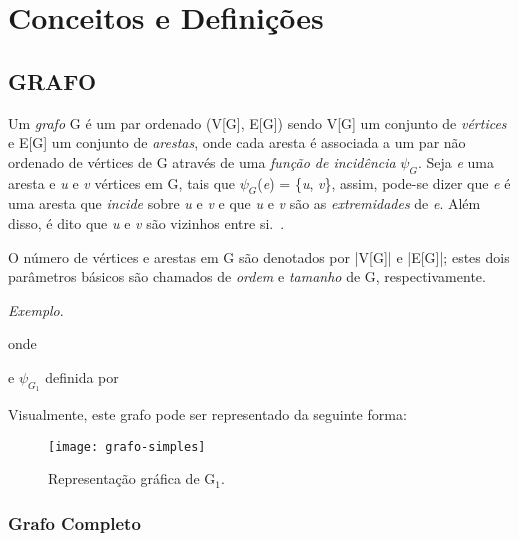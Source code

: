 \chapter{Conceitos e Definições}
\label{conceitos}

\section{\texorpdfstring{\MakeUppercase{Grafo}}{}}
\label{conceitos__grafo}

Um \emph{grafo} G é um par ordenado (V[G], E[G]) sendo V[G] um conjunto de \emph{vértices} e E[G] um conjunto de \emph{arestas}, onde cada aresta é associada a um par não ordenado de vértices de G através de uma \emph{função de incidência} $\psi_{G}$. Seja \emph{e} uma aresta e \emph{u} e \emph{v} vértices em G, tais que $\psi_{G}$(\emph{e}) = \{\emph{u}, \emph{v}\}, assim, pode-se dizer que \emph{e} é uma aresta que \emph{incide} sobre \emph{u} e \emph{v} e que \emph{u} e \emph{v} são as \emph{extremidades} de \emph{e}. Além disso, é dito que \emph{u} e \emph{v} são vizinhos entre si.~\cite{bondy1976graph}.

O número de vértices e arestas em G são denotados por |V[G]| e |E[G]|; estes
dois parâmetros básicos são chamados de \emph{ordem} e \emph{tamanho} de G, respectivamente.

\noindent\emph{Exemplo}.


\noindent onde



\noindent e $\psi_{G_{1}}$ definida por



Visualmente, este grafo pode ser representado da seguinte forma:

\begin{figure}[H]
\texttt{[image: grafo-simples]}
\centering
\caption{Representação gráfica de G$_{1}$.}
\end{figure}

\subsection{Grafo Completo}
\label{conceitos__grafo--comleto}


